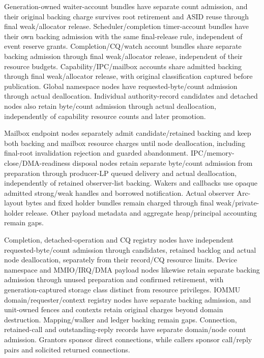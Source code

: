 \begin{itemize}
        Generation-owned waiter-account bundles have separate count admission, and
        their original backing charge survives root retirement and ASID reuse
        through final weak/allocator release. Scheduler/completion timer-account
        bundles have their own backing admission with the same final-release
        rule, independent of event reserve grants. Completion/CQ/watch account
        bundles share separate backing admission through final weak/allocator
        release, independent of their resource budgets. Capability/IPC/mailbox
        accounts share admitted backing through final weak/allocator release,
        with original classification captured before publication. Global namespace
        nodes have requested-byte/count admission through actual deallocation.
        Individual authority-record candidates and detached nodes also retain
        byte/count admission through actual deallocation, independently of
        capability resource counts and later promotion.
        
        Mailbox endpoint nodes separately admit candidate/retained backing and
        keep both backing and mailbox resource charges until node deallocation,
        including final-root invalidation rejection and guarded abandonment.
        IPC/memory-close/DMA-readiness disposal nodes retain separate byte/count
        admission from preparation through producer-LP queued delivery and
        actual deallocation, independently of retained observer-list backing.
        Wakers and callbacks use opaque admitted strong/weak handles and borrowed
        notification. Actual observer Arc-layout bytes and fixed holder bundles
        remain charged through final weak/private-holder release. Other payload
        metadata and aggregate heap/principal accounting remain gaps.
        
        Completion, detached-operation and CQ registry nodes have independent
        requested-byte/count admission through candidates, retained backlog and
        actual node deallocation, separately from their record/CQ resource limits.
        Device namespace and MMIO/IRQ/DMA payload nodes likewise retain separate
        backing admission through unused preparation and confirmed retirement,
        with generation-captured storage class distinct from resource privileges.
        IOMMU domain/requester/context registry nodes have separate backing
        admission, and unit-owned fences and contexts retain original charges beyond
        domain destruction. Mapping/walker and ledger backing remain gaps.
        Connection, retained-call and outstanding-reply records have separate
        domain/node count admission. Grantors sponsor direct connections, while
        callers sponsor call/reply pairs and solicited returned connections.
        

\end{itemize}
